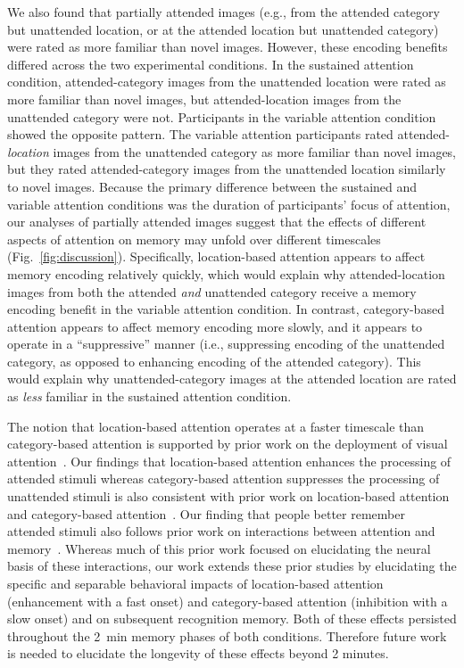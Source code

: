 \documentclass[english]{article}
\begin{document}
We also found that partially attended images (e.g., from the attended category
but unattended location, or at the attended location but unattended category)
were rated as more familiar than novel images. However, these encoding benefits
differed across the two experimental conditions. In the sustained attention
condition, attended-category images from the unattended location were rated as
more familiar than novel images, but attended-location images from the
unattended category were not. Participants in the variable attention condition
showed the opposite pattern. The variable attention participants rated
attended-\textit{location} images from the unattended category as more familiar
than novel images, but they rated attended-category images from the unattended
location similarly to novel images. Because the primary difference between the
sustained and variable attention conditions was the duration of participants'
focus of attention, our analyses of partially attended images suggest that the
effects of different aspects of attention on memory may unfold over different
timescales (Fig.~\ref{fig:discussion}). Specifically, location-based attention
appears to affect memory encoding relatively quickly, which would explain why
attended-location images from both the attended \textit{and} unattended
category receive a memory encoding benefit in the variable attention condition.
In contrast, category-based attention appears to affect memory encoding more
slowly, and it appears to operate in a ``suppressive'' manner (i.e.,
suppressing encoding of the unattended category, as opposed to enhancing
encoding of the attended category). This would explain why unattended-category
images at the attended location are rated as \textit{less} familiar in the
sustained attention condition.

The notion that location-based attention operates at a faster timescale than
category-based attention is supported by prior work on the deployment of visual
attention~\citep{SotoBlan04, StopEtal07}. Our findings that location-based
attention enhances the processing of attended stimuli whereas category-based
attention suppresses the processing of unattended stimuli is also consistent
with prior work on location-based attention~\citep[e.g.,][]{IttiKoch01} and
category-based attention~\citep[e.g.,][]{MoheEtal14}. Our finding that people
better remember attended stimuli also follows prior work on interactions
between attention and memory~\citep{PallWagn02, ChunTurk07, AlyTurk16,
AlyTurk17, WittEtal18, MorrEtal14, BaleEtal21}. Whereas much of this prior work
focused on elucidating the neural basis of these interactions, our work extends
these prior studies by elucidating the specific and separable behavioral
impacts of location-based attention (enhancement with a fast onset) and
category-based attention (inhibition with a slow onset) and on subsequent
recognition memory. Both of these effects persisted throughout the 2~min memory
phases of both conditions. Therefore future work is needed to elucidate the
longevity of these effects beyond 2 minutes.
\end{document}
